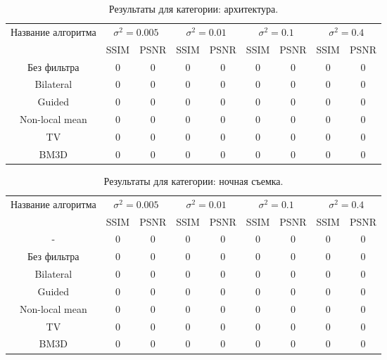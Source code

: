 \begin{table}[H]
	\caption{\label{tab:bolts} Результаты для категории: архитектура.}
	\begin{tabular}{|c|c|c|c|c|c|c|c|c|}
		\hline
	Название алгоритма & \multicolumn{2}{|c|}{$\sigma^2=0.005$}  & \multicolumn{2}{|c|}{$\sigma^2=0.01$}& \multicolumn{2}{|c|}{$\sigma^2=0.1$} & \multicolumn{2}{|c|}{$\sigma^2=0.4$} \\
		\cline{2-9}
		& SSIM  & PSNR & SSIM  & PSNR & SSIM  & PSNR & SSIM  & PSNR\\
		\hline
Без фильтра& 0 & 0& 0 & 0& 0 & 0 & 0 & 0 \\
\hline
		Bilateral& 0 & 0& 0 & 0& 0 & 0 & 0 & 0 \\
		\hline
		Guided & 0 & 0& 0 & 0& 0 & 0 & 0 & 0 \\
		\hline
		Non-local mean& 0 & 0& 0 & 0& 0 & 0 & 0 & 0 \\
		\hline
		TV & 0 & 0& 0 & 0& 0 & 0 & 0 & 0 \\
		\hline
		BM3D & 0 & 0& 0 & 0& 0 & 0 & 0 & 0 \\
		\hline	
	\end{tabular}
\end{table}

\begin{table}[H]
	\caption{\label{tab:bolts} Результаты для категории: ночная съемка.}
	\begin{tabular}{|c|c|c|c|c|c|c|c|c|}
		\hline
	Название алгоритма & \multicolumn{2}{|c|}{$\sigma^2=0.005$}  & \multicolumn{2}{|c|}{$\sigma^2=0.01$}& \multicolumn{2}{|c|}{$\sigma^2=0.1$} & \multicolumn{2}{|c|}{$\sigma^2=0.4$} \\
		\cline{2-9}
		& SSIM  & PSNR & SSIM  & PSNR & SSIM  & PSNR & SSIM  & PSNR\\
		- & 0 & 0& 0 & 0& 0 & 0 & 0 & 0 \\
		\hline
Без фильтра & 0 & 0& 0 & 0& 0 & 0 & 0 & 0 \\
\hline
		Bilateral & 0 & 0& 0 & 0& 0 & 0 & 0 & 0 \\
		\hline
		Guided & 0 & 0& 0 & 0& 0 & 0 & 0 & 0 \\
		\hline
		Non-local mean & 0 & 0& 0 & 0& 0 & 0 & 0 & 0 \\
		\hline
		TV & 0 & 0& 0 & 0& 0 & 0 & 0 & 0 \\
		\hline
		BM3D & 0 & 0& 0 & 0& 0 & 0 & 0 & 0 \\
		\hline	
	\end{tabular}
\end{table}

